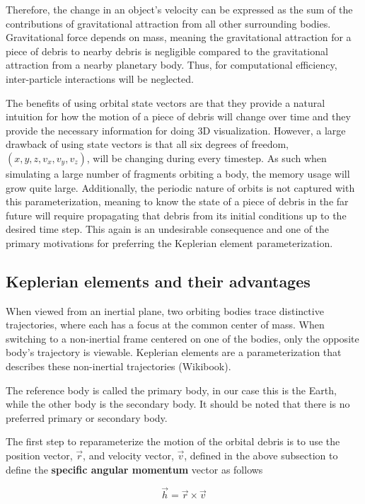 \documentclass[a4paper, 12pt]{article}
\newcommand{\boldindex}[1]{%
	\textbf{#1}\index{#1}%
}
\begin{document}
Therefore, the change in an object's velocity can be expressed as the sum of the contributions of gravitational attraction from all other surrounding bodies. Gravitational force depends on mass, meaning the gravitational attraction for a piece of debris to nearby debris is negligible compared to the gravitational attraction from a nearby planetary body. Thus, for computational efficiency, inter-particle interactions will be neglected.

The benefits of using orbital state vectors are that they provide a natural intuition for how the motion of a piece of debris will change over time and they provide the necessary information for doing 3D visualization. However, a large drawback of using state vectors is that all six degrees of freedom, $ (x, y, z, v_x, v_y, v_z)$, will be changing during every timestep. As such when simulating a large number of fragments orbiting a body, the memory usage will grow quite large. Additionally, the periodic nature of orbits is not captured with this parameterization, meaning to know the state of a piece of debris in the far future will require propagating that debris from its initial conditions up to the desired time step. This again is an undesirable consequence and one of the primary motivations for preferring the Keplerian element parameterization.
 
\newpage
\subsection{Keplerian elements and their advantages}

When viewed from an inertial plane, two orbiting bodies trace distinctive trajectories, where each has a focus at the common center of mass.  When switching to a non-inertial frame centered on one of the bodies, only the opposite body's trajectory is viewable. Keplerian elements are a parameterization that describes these non-inertial trajectories (Wikibook).

The reference body is called the primary body, in our case this is the Earth, while the other body is the secondary body. It should be noted that there is no preferred primary or secondary body.

The first step to reparameterize the motion of the orbital debris is to use the position vector, $\vec{r}$, and velocity vector, $\vec{v}$, defined in the above subsection to define the \boldindex{specific angular momentum} vector as follows

\begin{equation}
\vec{h} = \vec{r} \times \vec{v}
\end{equation}
\end{document}
